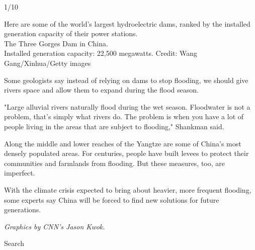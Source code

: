 1/10

Here are some of the world's largest hydroelectric dams, ranked by the
installed generation capacity of their power stations.\\
The Three Gorges Dam in China.\\
Installed generation capacity: 22,500 megawatts. Credit: Wang
Gang/Xinhua/Getty images

Some geologists say instead of relying on dams to stop flooding, we
should give rivers space and allow them to expand during the flood
season.

"Large alluvial rivers naturally flood during the wet season. Floodwater
is not a problem, that's simply what rivers do. The problem is when you
have a lot of people living in the areas that are subject to flooding,"
Shankman said.

Along the middle and lower reaches of the Yangtze are some of China's
most densely populated areas. For centuries, people have built levees to
protect their communities and farmlands from flooding. But these
measures, too, are imperfect.

With the climate crisis expected to bring about heavier, more frequent
flooding, some experts say China will be forced to find new solutions
for future generations.

\emph{Graphics by CNN's Jason Kwok.}

Search

